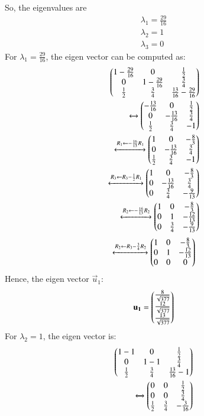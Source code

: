 \documentclass[journal,12pt,twocolumn]{IEEEtran}
\begin{document}
	So, the eigenvalues are 
\begin{align}
	\lambda_1 = \frac{29}{16}	\\
	\lambda_2 = 1	\\
	\lambda_3 = 0
\end{align}
For $\lambda_1 = \frac{29}{16}$, the eigen vector can be computed as:
\begin{align}
	\begin{pmatrix}1-\frac{29}{16} & 0 & \frac{1}{2} \\
	 0 & 1 - \frac{29}{16} & \frac{3}{4} \\
	\frac{1}{2} & \frac{3}{4} & \frac{13}{16}-\frac{29}{16} \end{pmatrix}  \\
	\xleftrightarrow[]{}
	\begin{pmatrix}-\frac{13}{16} & 0 & \frac{1}{2}\\ 
	0 & -\frac{13}{16} & \frac{3}{4} \\
	\frac{1}{2} & \frac{3}{4} & -1\end{pmatrix} \\
	\xleftrightarrow[]{R_1 \leftarrow - \frac{16}{13}R_1}
	\begin{pmatrix}1 & 0 & -\frac{8}{3} \\ 0 & -\frac{13}{16} & \frac{3}{4} \\
	\frac{1}{2} & \frac{3}{4} & -1\end{pmatrix} \\
	\xleftrightarrow[]{R_3 \leftarrow R_3-\frac{1}{2}R_1}
	\begin{pmatrix}1 & 0 & -\frac{8}{3} \\ 0 & -\frac{13}{16} & \frac{3}{4} \\
	0 & \frac{3}{4} & -\frac{9}{13} \end{pmatrix} \\
	\xleftrightarrow[]{R_2 \leftarrow -\frac{16}{13}R_2}
	\begin{pmatrix}1 & 0 & -\frac{8}{3} \\ 0 & 1 & -\frac{12}{13} \\
	0 & \frac{3}{4} & -\frac{9}{13} \end{pmatrix} 
\end{align}
\begin{align}
	\xleftrightarrow[]{R_2 \leftarrow R_3-\frac{3}{4}R_2}
	\begin{pmatrix}1 & 0 & -\frac{8}{3} \\ 0 & 1 & -\frac{12}{13} \\
	0 & 0 & 0 \end{pmatrix}
\end{align}
Hence, the eigen vector $\vec{u}_1$:
\begin{align}
	\mathbf{u_1}= \begin{pmatrix}\frac{8}{\sqrt{377}} \\ \frac{12}{\sqrt{377}} \\
	\frac{13}{\sqrt{377}} \end{pmatrix}
\end{align}
For $\lambda_2=1$, the eigen vector is:
\begin{align}
	\begin{pmatrix}1-1 & 0 & \frac{1}{2} \\ 0 & 1-1 & \frac{3}{4} \\
	\frac{1}{2} & \frac{3}{4} & \frac{13}{16}-1 \end{pmatrix}  \\
	\xleftrightarrow[]{}
	\begin{pmatrix}0 & 0 & \frac{1}{2} \\ 0 & 0 & \frac{3}{4} \\
	\frac{1}{2} & \frac{3}{4} & -\frac{3}{16} \end{pmatrix}  
\end{align}
\end{document}
